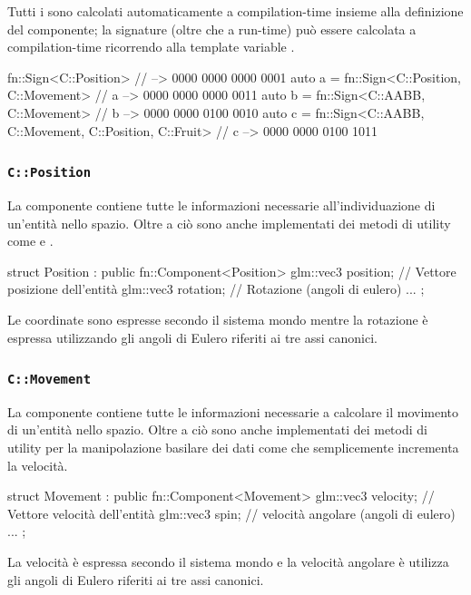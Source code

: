 Tutti i  sono calcolati automaticamente a compilation-time insieme alla definizione del componente; la signature (oltre che a run-time) può essere calcolata a compilation-time ricorrendo alla template variable .

\begin{cpp}[caption={
		Anche le Sign sono generate durante la compilazione. In ogni caso è comunque possibile a runtime effettuare esplicitamente operazioni manipolazione dei singoli Cid.
	}, captionpos=t]
	fn::Sign<C::Position> // -->  0000 0000 0000 0001  
    auto a = fn::Sign<C::Position, C::Movement>
    // a  -->  0000 0000 0000 0011
    auto b = fn::Sign<C::AABB, C::Movement>
    // b  -->  0000 0000 0100 0010 
    auto c = fn::Sign<C::AABB, C::Movement, C::Position, C::Fruit>
    // c  -->  0000 0000 0100 1011 
\end{cpp}

\subsubsection{\texttt{C::Position}}
La componente  contiene tutte le informazioni necessarie all'individuazione di un'entità nello spazio. Oltre a ciò sono anche implementati dei metodi di utility come  e .
\begin{cpp}
struct Position : public fn::Component<Position> {
	glm::vec3 position;       // Vettore posizione dell'entità
	glm::vec3 rotation;       // Rotazione (angoli di eulero) 
	...
};
\end{cpp}
Le coordinate sono espresse secondo il sistema mondo mentre la rotazione è espressa utilizzando gli angoli di Eulero riferiti ai tre assi canonici.

\subsubsection{\texttt{C::Movement}}
La componente  contiene tutte le informazioni necessarie a calcolare il movimento di un'entità nello spazio. Oltre a ciò sono anche implementati dei metodi di utility per la manipolazione basilare dei dati come  che semplicemente incrementa la velocità.
\begin{cpp}
 struct Movement : public fn::Component<Movement> {
	 glm::vec3 velocity;   // Vettore velocità dell'entità
	 glm::vec3 spin;       // velocità angolare (angoli di eulero) 
	 ...
};
\end{cpp}
La velocità è espressa secondo il sistema mondo e la velocità angolare è utilizza gli angoli di Eulero riferiti ai tre assi canonici.



